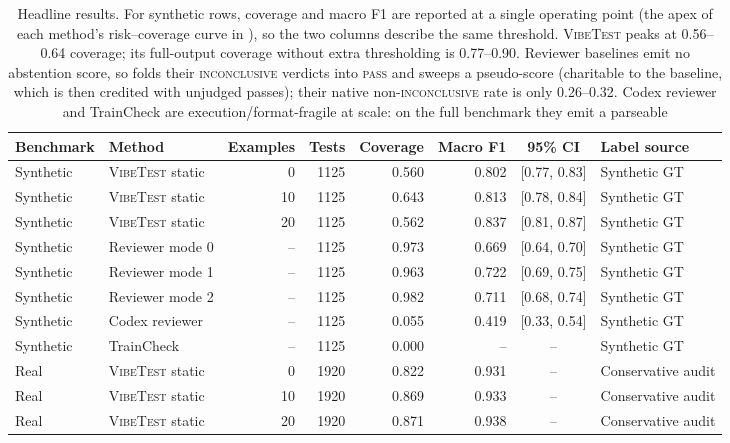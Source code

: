 \documentclass[11pt]{article}
\newcommand{\pass}{\textsc{pass}}
\newcommand{\inconclusive}{\textsc{inconclusive}}
\newcommand{\vibetest}{\textsc{VibeTest}}
\begin{document}
\begin{table}[t]
  \centering
  \small
  \begin{tabular}{llrrrr c l}
    \toprule
    Benchmark & Method & Examples & Tests & Coverage & Macro F1 & 95\% CI & Label source \\
    \midrule
    Synthetic & \vibetest{} static & 0 & 1125 & 0.560 & 0.802 & {\scriptsize[0.77, 0.83]} & Synthetic GT \\
    Synthetic & \vibetest{} static & 10 & 1125 & 0.643 & 0.813 & {\scriptsize[0.78, 0.84]} & Synthetic GT \\
    Synthetic & \vibetest{} static & 20 & 1125 & 0.562 & 0.837 & {\scriptsize[0.81, 0.87]} & Synthetic GT \\
    Synthetic & Reviewer mode 0 & -- & 1125 & 0.973 & 0.669 & {\scriptsize[0.64, 0.70]} & Synthetic GT \\
    Synthetic & Reviewer mode 1 & -- & 1125 & 0.963 & 0.722 & {\scriptsize[0.69, 0.75]} & Synthetic GT \\
    Synthetic & Reviewer mode 2 & -- & 1125 & 0.982 & 0.711 & {\scriptsize[0.68, 0.74]} & Synthetic GT \\
    Synthetic & Codex reviewer & -- & 1125 & 0.055 & 0.419 & {\scriptsize[0.33, 0.54]} & Synthetic GT \\
    Synthetic & TrainCheck & -- & 1125 & 0.000 & -- & -- & Synthetic GT \\
    Real & \vibetest{} static & 0 & 1920 & 0.822 & 0.931 & -- & Conservative audit \\
    Real & \vibetest{} static & 10 & 1920 & 0.869 & 0.933 & -- & Conservative audit \\
    Real & \vibetest{} static & 20 & 1920 & 0.871 & 0.938 & -- & Conservative audit \\
    \bottomrule
  \end{tabular}
  \caption{Headline results. For synthetic rows, coverage and macro F1 are
  reported at a single operating point (the apex of each method's
  risk--coverage curve in ), so the two columns describe
  the same threshold. \vibetest{} peaks at 0.56--0.64 coverage; its full-output
  coverage without extra thresholding is 0.77--0.90. Reviewer baselines emit no
  abstention score, so  folds their \inconclusive{}
  verdicts into \pass{} and sweeps a pseudo-score (charitable to the baseline,
  which is then credited with unjudged passes); their native
  non-\inconclusive{} rate is only 0.26--0.32. Codex reviewer and TrainCheck are
  execution/format-fragile at scale: on the full benchmark they emit a parseable
}
\end{table}
\end{document}
